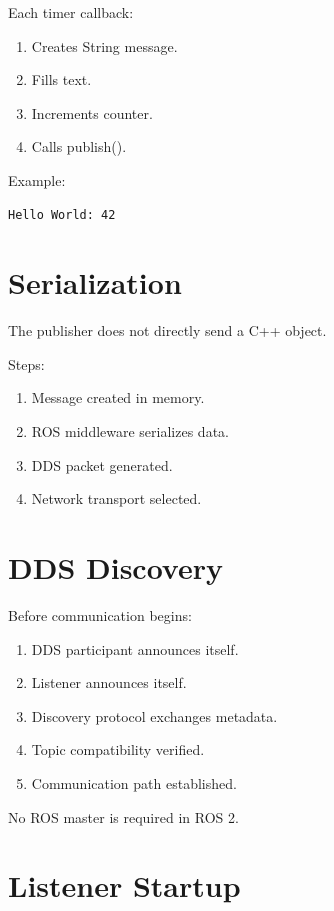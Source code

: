 \documentclass[11pt]{article}
\begin{document}
Each timer callback:

\begin{enumerate}
\item Creates String message.
\item Fills text.
\item Increments counter.
\item Calls publish().
\end{enumerate}

Example:

\begin{verbatim}
Hello World: 42
\end{verbatim}

\section{Serialization}

The publisher does not directly send a C++ object.

Steps:

\begin{enumerate}
\item Message created in memory.
\item ROS middleware serializes data.
\item DDS packet generated.
\item Network transport selected.
\end{enumerate}

\section{DDS Discovery}

Before communication begins:

\begin{enumerate}
\item DDS participant announces itself.
\item Listener announces itself.
\item Discovery protocol exchanges metadata.
\item Topic compatibility verified.
\item Communication path established.
\end{enumerate}

No ROS master is required in ROS 2.

\section{Listener Startup}
\end{document}
